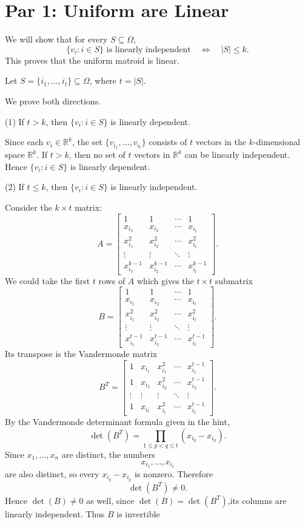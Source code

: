 \documentclass[11pt]{article}
\begin{document}
\section*{Par 1: Uniform are Linear}

We will show that for every \(S\subseteq \Omega\),
\[
\{v_i:i\in S\}\text{ is linearly independent}
\quad \Longleftrightarrow \quad
|S|\le k.
\]
This proves that the uniform matroid is linear.


Let \(S=\{i_1,\dots,i_t\}\subseteq \Omega\), where \(t=|S|\).

We prove both directions.

\medskip
(1) If \(t>k\), then \(\{v_i:i\in S\}\) is linearly dependent.

Since each \(v_i\in \mathbb R^k\), the set \(\{v_{i_1},\dots,v_{i_t}\}\) consists of \(t\) vectors in the \(k\)-dimensional space \(\mathbb R^k\). If \(t>k\), then no set of \(t\) vectors in \(\mathbb R^k\) can be linearly independent. Hence \(\{v_i:i\in S\}\) is linearly dependent.

(2) If \(t\le k\), then \(\{v_i:i\in S\}\) is linearly independent.

Consider the \(k\times t\) matrix:
\[
A=
\begin{bmatrix}
1 & 1 & \cdots & 1\\
x_{i_1} & x_{i_2} & \cdots & x_{i_t}\\
x_{i_1}^2 & x_{i_2}^2 & \cdots & x_{i_t}^2\\
\vdots & \vdots & \ddots & \vdots\\
x_{i_1}^{k-1} & x_{i_2}^{k-1} & \cdots & x_{i_t}^{k-1}
\end{bmatrix}.
\]
We could take the first \(t\) rows of \(A\) which gives the \(t\times t\) submatrix
\[
B=
\begin{bmatrix}
1 & 1 & \cdots & 1\\
x_{i_1} & x_{i_2} & \cdots & x_{i_t}\\
x_{i_1}^2 & x_{i_2}^2 & \cdots & x_{i_t}^2\\
\vdots & \vdots & \ddots & \vdots\\
x_{i_1}^{t-1} & x_{i_2}^{t-1} & \cdots & x_{i_t}^{t-1}
\end{bmatrix}.
\]
Its transpose is the Vandermonde matrix
\[
B^{T}=
\begin{bmatrix}
1 & x_{i_1} & x_{i_1}^2 & \cdots & x_{i_1}^{t-1}\\
1 & x_{i_2} & x_{i_2}^2 & \cdots & x_{i_2}^{t-1}\\
\vdots & \vdots & \vdots & \ddots & \vdots\\
1 & x_{i_t} & x_{i_t}^2 & \cdots & x_{i_t}^{t-1}
\end{bmatrix}.
\]
By the Vandermonde determinant formula given in the hint,
\[
\det(B^T)=\prod_{1\le p<q\le t}(x_{i_q}-x_{i_p}).
\]
Since \(x_1,\dots,x_n\) are distinct, the numbers
\[
x_{i_1},\dots,x_{i_t}
\]
are also distinct, so every \(x_{i_q}-x_{i_p}\) is nonzero. Therefore
\[
\det(B^T)\neq 0.
\]
Hence \(\det(B)\neq 0\) as well, since \(\det(B)=\det(B^T)\),its columns are linearly independent. Thus \(B\) is invertible
\end{document}
